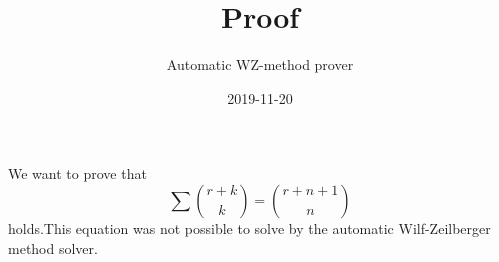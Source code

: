 \documentclass{article}
\title{Proof}
\author{Automatic WZ-method prover}
\date{2019-11-20}
\begin{document}
\maketitle
We want to prove that
\begin{equation}\label{Eq: 1}
\sum \binom{r+k}{k} = \binom{r+n+1}{n}
\end{equation}
holds.This equation was not possible to solve by the automatic Wilf-Zeilberger method solver.
\end{document}
